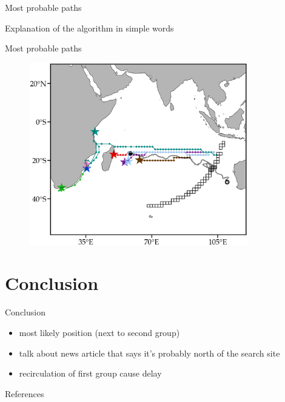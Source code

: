 \documentclass{beamer}
\begin{document}
\begin{frame}{Most probable paths}  

Explanation of the algorithm in simple words
\end{frame}

\begin{frame}{Most probable paths}  

\begin{figure}[hbt]
  \includegraphics[width=0.85\textwidth]{figures/mh370-fig05.png}
\end{figure}

\end{frame}

\section{Conclusion}
\begin{frame}{Conclusion}

\begin{itemize}
	\item most likely position (next to second group)
	\item talk about news article that says it's probably north of the search site
	\item recirculation of first group cause delay
\end{itemize}
\end{frame}

\begin{frame}{References}
\printbibliography
\end{frame}
\end{document}
